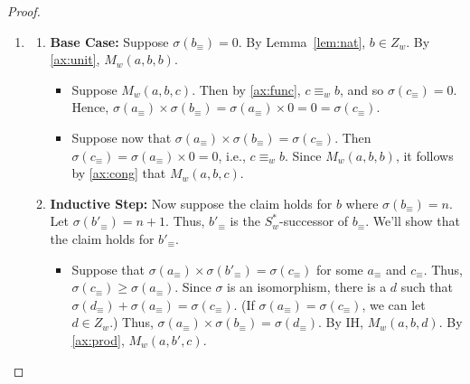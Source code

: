 \documentclass[12pt]{article}
\begin{document}
\begin{proof}
\begin{enumerate}
        \item 
        \begin{enumerate}[label=(\roman*)]
            \item \textbf{Base Case:} Suppose $\sigma(b_\equiv) = 0$. 
            By Lemma~\ref{lem:nat}, $b \in Z_w$. 
            By \ref{ax:unit}, $M_w(a,b,b)$. 
            \begin{itemize}
                \item[($\Rightarrow$)] Suppose $M_w(a,b,c)$. 
                Then by \ref{ax:func}, $c \equiv_w b$, and so $\sigma(c_\equiv) = 0$. 
                Hence, $\sigma(a_\equiv) \times \sigma(b_\equiv) = \sigma(a_\equiv) \times 0 = 0 = \sigma(c_\equiv)$. 

                \item[($\Leftarrow$)] Suppose now that $\sigma(a_\equiv) \times \sigma(b_\equiv) = \sigma(c_\equiv)$. 
                Then $\sigma(c_\equiv) = \sigma(a_\equiv) \times 0 = 0$, i.e., $c \equiv_w b$. 
                Since $M_w(a,b,b)$, it follows by \ref{ax:cong} that $M_w(a,b,c)$. 
            \end{itemize}

            \item \textbf{Inductive Step:} Now suppose the claim holds for $b$ where $\sigma(b_\equiv) = n$. 
            Let $\sigma(b'_\equiv) = n+1$. 
            Thus, $b'_\equiv$ is the $S_w^*$-successor of $b_\equiv$. 
            We'll show that the claim holds for $b'_\equiv$. 
            \begin{itemize}
                \item[($\Leftarrow$)] Suppose that $\sigma(a_\equiv) \times \sigma(b'_\equiv) = \sigma(c_\equiv)$ for some $a_\equiv$ and $c_\equiv$. 
                Thus, $\sigma(c_\equiv) \geq \sigma(a_\equiv)$. 
                Since $\sigma$ is an isomorphism, there is a $d$ such that $\sigma(d_\equiv) + \sigma(a_\equiv) = \sigma(c_\equiv)$. 
                (If $\sigma(a_\equiv) = \sigma(c_\equiv)$, we can let $d \in Z_w$.) 
                Thus, $\sigma(a_\equiv) \times \sigma(b_\equiv) = \sigma(d_\equiv)$. 
                By IH, $M_w(a,b,d)$. 
                By \ref{ax:prod}, $M_w(a,b',c)$. 



\end{itemize}
\end{enumerate}
\end{enumerate}
\end{proof}
\end{document}

